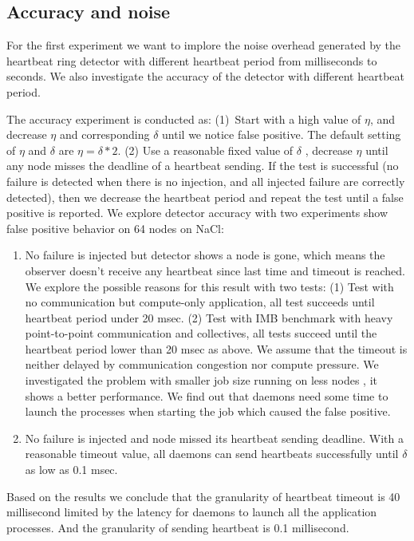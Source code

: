 \documentclass[sigconf]{acmart}
\begin{document}
\subsection{Accuracy and noise}
For the first experiment we want to implore the noise overhead generated by the heartbeat ring detector with different heartbeat period from milliseconds to seconds. We also investigate the accuracy of the detector with different heartbeat period. 

The accuracy experiment is conducted as: (1)\ Start with a high value of $ \eta $, and decrease $ \eta $ and corresponding $ \delta $ until we notice false positive. The default setting of $ \eta $ and $ \delta $ are $ \eta = \delta * 2 $. (2) Use a reasonable fixed value of  $ \delta $ , decrease  $ \eta $ until any node misses the deadline of a heartbeat sending.   If the test is successful (no failure is detected when there is no injection, and all injected failure are correctly detected), then we decrease the heartbeat period and repeat the test until a false positive is reported. We explore detector accuracy with two experiments show false positive behavior on 64 nodes on NaCl: 
\begin{enumerate}
  \item No failure is injected but detector shows a node is gone, which means the observer doesn't receive any heartbeat since last time and timeout is reached. We explore the possible reasons for this result with two tests: (1) Test with no communication but compute-only application, all test succeeds until heartbeat period under 20 msec. (2) Test with IMB benchmark with heavy point-to-point communication and collectives, all tests succeed until the heartbeat period lower than 20 msec as above. We assume that the timeout is neither delayed by communication congestion nor compute pressure. We investigated the problem with smaller job size running on less nodes , it shows a better performance. We find out that daemons need some time to launch the processes when starting the job which caused the false positive. 
  \item No failure is injected and node missed its heartbeat sending deadline. With a reasonable timeout value, all daemons can send heartbeats successfully until $ \delta $ as low as 0.1 msec. 
\end{enumerate}

Based on the results we conclude that the granularity of heartbeat timeout is 40 millisecond limited by the latency for daemons to launch all the application processes. And the granularity of sending heartbeat is 0.1 millisecond.  
\end{document}
